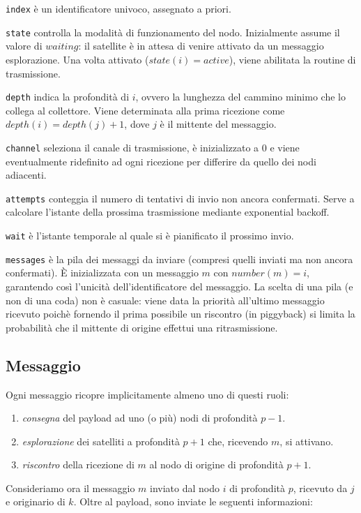 \documentclass[a4paper,11pt]{article}
\theoremstyle{definition}
\begin{document}
\texttt{index} è un identificatore univoco, assegnato a priori.

\texttt{state} controlla la modalità di funzionamento del nodo. Inizialmente assume il valore di $waiting$: il satellite è in attesa di venire attivato da un messaggio esplorazione. Una volta attivato ($state(i) = active$), viene abilitata la routine di trasmissione.

\texttt{depth} indica la profondità di $i$, ovvero la lunghezza del cammino minimo che lo collega al collettore. Viene determinata alla prima ricezione come $depth(i) = depth(j) + 1$, dove $j$ è il mittente del messaggio.

\texttt{channel} seleziona il canale di trasmissione, è inizializzato a $0$ e viene eventualmente ridefinito ad ogni ricezione per differire da quello dei nodi adiacenti.

\texttt{attempts} conteggia il numero di tentativi di invio non ancora confermati. Serve a calcolare l'istante della prossima trasmissione mediante exponential backoff.

\texttt{wait} è l'istante temporale al quale si è pianificato il prossimo invio.

\texttt{messages} è la pila dei messaggi da inviare (compresi quelli inviati ma non ancora confermati). È inizializzata con un messaggio $m$ con $number(m) = i$, garantendo così l'unicità dell'identificatore del messaggio. La scelta di una pila (e non di una coda) non è casuale: viene data la priorità all'ultimo messaggio ricevuto poichè fornendo il prima possibile un riscontro (in piggyback) si limita la probabilità che il mittente di origine effettui una ritrasmissione.

\subsection{Messaggio}

Ogni messaggio ricopre implicitamente almeno uno di questi ruoli:
\begin{enumerate}
\item \emph{consegna} del payload ad uno (o più) nodi di profondità $p-1$.
\item \emph{esplorazione} dei satelliti a profondità $p+1$ che, ricevendo $m$, si attivano.
\item \emph{riscontro} della ricezione di $m$ al nodo di origine di profondità $p+1$.
\end{enumerate}

Consideriamo ora il messaggio $m$ inviato dal nodo $i$ di profondità $p$, ricevuto da $j$ e originario di $k$. Oltre al payload, sono inviate le seguenti informazioni:
\end{document}
